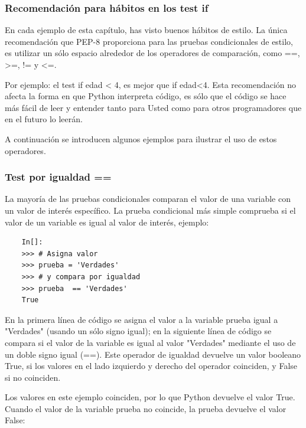 

\subsubsection{Recomendación para  hábitos en los test if}

En cada ejemplo de esta capítulo, has visto buenos hábitos de estilo. La única recomendación que PEP-8 proporciona para las pruebas condicionales de estilo, es utilizar un sólo espacio alrededor de los operadores de comparación, como {\ttfamily ==, >=, !=} y {\ttfamily <=}.

Por ejemplo: el test {\ttfamily if edad < 4},  es mejor que {\ttfamily if edad<4}.  Esta recomendación  no afecta la forma en que Python interpreta código, es sólo que el código se hace más fácil de leer y entender tanto para Usted como para otros programadores que en el futuro lo leerán.




A continuación se introducen algunos ejemplos para ilustrar el uso de estos operadores.   


\subsubsection{Test por igualdad {\ttfamily ==}}

La mayoría de las pruebas condicionales comparan el valor de una variable con un valor de interés específico. La prueba condicional más simple comprueba si el valor de un variable es igual al valor de interés, ejemplo:

\begin{lstlisting}
	In[]:
	>>> # Asigna valor
	>>> prueba = 'Verdades'
	>>> # y compara por igualdad  
	>>> prueba  == 'Verdades'	
	True
\end{lstlisting}

En la primera línea de código se asigna el valor a la variable {\ttfamily prueba} igual a {\ttfamily {}"{}Verdades{}"{}} (usando un sólo  signo igual); en la siguiente línea de código se compara si el valor de la variable es igual al valor  {}"{}Verdades{}"{}  mediante el uso de un doble signo igual ({\ttfamily==}). Este operador de igualdad devuelve un valor booleano {\ttfamily True},  si los valores en el lado izquierdo y derecho del operador coinciden, y   {\ttfamily False} si no coinciden.

Los valores en este ejemplo coinciden, por lo que Python devuelve el valor  {\ttfamily True}. Cuando el valor de la variable prueba no coincide, la prueba devuelve el valor {\ttfamily False}:

